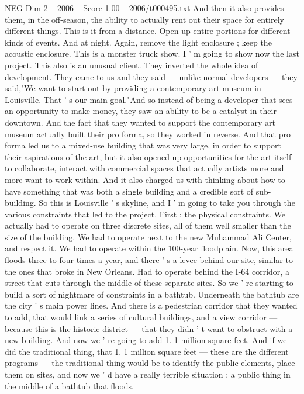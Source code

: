 \begin{textsample}{NEG Dim 2 – 2006 – Score 1.00 – 2006/t000495.txt}
And then it also provides them, in the off-season, the ability to actually rent out their space for entirely different things.
This is it from a distance.
Open up entire portions for different kinds of events.
And at night.
Again, remove the light enclosure ; keep the acoustic enclosure.
This is a monster truck show.
I ' m going to show now the last project.
This also is an unusual client.
They inverted the whole idea of development.
They came to us and they said — unlike normal developers — they said,"We want to start out by providing a contemporary art museum in Louisville.
That ' s our main goal."And so instead of being a developer that sees an opportunity to make money, they saw an ability to be a catalyst in their downtown.
And the fact that they wanted to support the contemporary art museum actually built their pro forma, so they worked in reverse.
And that pro forma led us to a mixed-use building that was very large, in order to support their aspirations of the art, but it also opened up opportunities for the art itself to collaborate, interact with commercial spaces that actually artists more and more want to work within.
And it also charged us with thinking about how to have something that was both a single building and a credible sort of sub-building.
So this is Louisville ' s skyline, and I ' m going to take you through the various constraints that led to the project.
First : the physical constraints.
We actually had to operate on three discrete sites, all of them well smaller than the size of the building.
We had to operate next to the new Muhammad Ali Center, and respect it.
We had to operate within the 100-year floodplain.
Now, this area floods three to four times a year, and there ' s a levee behind our site, similar to the ones that broke in New Orleans.
Had to operate behind the I-64 corridor, a street that cuts through the middle of these separate sites.
So we ' re starting to build a sort of nightmare of constraints in a bathtub.
Underneath the bathtub are the city ' s main power lines.
And there is a pedestrian corridor that they wanted to add, that would link a series of cultural buildings, and a view corridor — because this is the historic district — that they didn ' t want to obstruct with a new building.
And now we ' re going to add 1. 1 million square feet.
And if we did the traditional thing, that 1. 1 million square feet — these are the different programs — the traditional thing would be to identify the public elements, place them on sites, and now we ' d have a really terrible situation : a public thing in the middle of a bathtub that floods.

\end{textsample}
